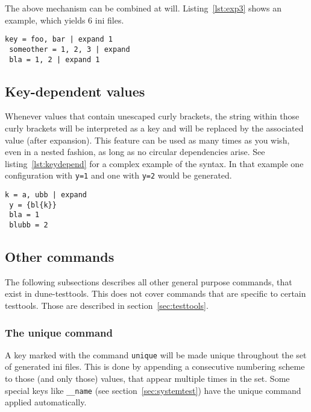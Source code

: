 \documentclass[11pt]{article}
\begin{document}
The above mechanism can be combined at will. Listing~\ref{lst:exp3} shows an example, which yields 6 ini files.

\begin{lstlisting}[caption={A simple combining multiple expansions},label=lst:exp3]
 key = foo, bar | expand 1
 someother = 1, 2, 3 | expand
 bla = 1, 2 | expand 1
\end{lstlisting}

\subsection{Key-dependent values}
\label{sec:keydepend}

Whenever values that contain unescaped curly brackets, the string within those curly brackets will be interpreted as a key and will be replaced by the associated value (after expansion). This feature can be used as many times as you wish, even in a nested fashion, as long as no circular dependencies arise. See listing~\ref{lst:keydepend} for a complex example of the syntax. In that example one configuration with \lstinline!y=1! and one with \lstinline!y=2! would be generated.

\begin{lstlisting}[caption={A complex example of key-dependent value syntax},label=lst:keydepend]
 k = a, ubb | expand
 y = {bl{k}}
 bla = 1
 blubb = 2
\end{lstlisting}

\subsection{Other commands}

The following subsections describes all other general purpose commands, that exist in dune-testtools. This does not cover commands that are specific to certain testtools. Those are described in section~\ref{sec:testtools}.

\subsubsection{The unique command}

A key marked with the command \lstinline!unique! will be made unique throughout the set of generated ini files. This is done by appending a consecutive numbering scheme to those (and only those) values, that appear multiple times in the set. Some special keys like \lstinline!__name! (see section~\ref{sec:systemtest}) have the unique command applied automatically.
\end{document}
